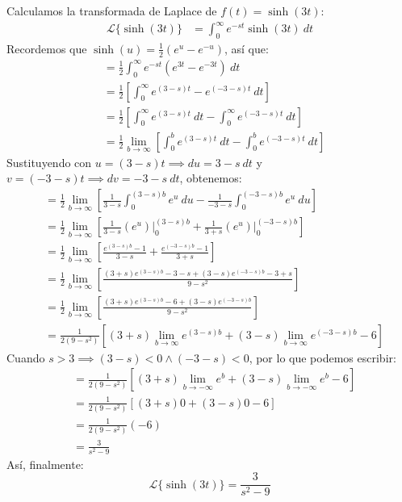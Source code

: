 \documentclass[12pt, a4paper]{article}
\begin{document}
Calculamos la transformada de Laplace de \(f(t) = \sinh(3t)\):
\begin{align*}
	\mathcal{L}\{\sinh(3t)\} &= \int_{0}^{\infty} e^{-st} \sinh(3t) \ dt
\end{align*}
Recordemos que \(\sinh(u) = \frac{1}{2} (e^{u} - e^{-u})\), así que:
\begin{align*}
	&= \frac{1}{2} \int_{0}^{\infty} e^{-st} (e^{3t} - e^{-3t}) \ dt \\
	&= \frac{1}{2} \left[ \int_{0}^{\infty} e^{(3-s)t} - e^{(-3-s)t} \ dt \right] \\
	&= \frac{1}{2} \left[ \int_{0}^{\infty} e^{(3-s)t} \ dt - \int_{0}^{\infty} e^{(-3-s)t} \ dt \right] \\
	&= \frac{1}{2} \lim_{b \to \infty} \left[ \int_{0}^{b} e^{(3-s)t} \ dt - \int_{0}^{b} e^{(-3-s)t} \ dt \right]
\end{align*}
Sustituyendo con \(u = (3-s)t \implies du = 3-s\ dt\) y \(v = (-3-s)t \implies dv = -3-s\ dt\), obtenemos:
\begin{align*}
	&= \frac{1}{2} \lim_{b \to \infty} \left[ \frac{1}{3-s} \int_{0}^{(3-s)b} e^{u} \ du - \frac{1}{-3-s} \int_{0}^{(-3-s)b} e^{u} \ du \right] \\
	&= \frac{1}{2} \lim_{b \to \infty} \left[ \frac{1}{3-s} \left. \left( e^{u} \right) \right|_{0}^{(3-s)b} + \frac{1}{3+s} \left. \left( e^{u} \right) \right|_{0}^{(-3-s)b} \right] \\
	&= \frac{1}{2} \lim_{b \to \infty} \left[ \frac{e^{(3-s)b} - 1}{3-s} + \frac{e^{(-3-s)b} - 1}{3+s} \right] \\
	&= \frac{1}{2} \lim_{b \to \infty} \left[ \frac{(3+s) e^{(3-s)b} - 3 - s + (3-s)e^{(-3-s)b} - 3 + s}{9-s ^{2}} \right] \\
	&= \frac{1}{2} \lim_{b \to \infty} \left[ \frac{(3+s) e^{(3-s)b} - 6 + (3-s)e^{(-3-s)b}}{9-s ^{2}} \right] \\
	&= \frac{1}{2(9-s ^{2})} \left[ (3+s) \lim_{b \to \infty} e^{(3-s)b} + (3-s) \lim_{b \to \infty} e^{(-3-s)b} - 6 \right]
\end{align*}
Cuando \(s > 3 \implies (3-s) < 0 \land (-3-s) < 0\), por lo que podemos escribir:
\begin{align*}
	&= \frac{1}{2(9-s ^{2})} \left[ (3+s) \lim_{b \to -\infty} e^{b} + (3-s) \lim_{b \to -\infty} e^{b} - 6 \right] \\
	&= \frac{1}{2(9-s ^{2})} \left[ (3+s) 0 + (3-s) 0 - 6 \right] \\
	&= \frac{1}{2(9-s ^{2})} (-6) \\
	&= \frac{3}{s ^{2} - 9}
\end{align*}
Así, finalmente:
\[
	\mathcal{L}\{\sinh(3t)\} = \frac{3}{s ^{2} - 9}
\]
\end{document}
